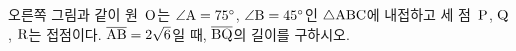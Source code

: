 \noindent\begin{minipage}[t]{0.58\linewidth}\vspace{0pt}\raggedright 오른쪽 그림과 같이 원~$\mathrm{O}$는 $\angle\mathrm{A}=75^\circ$, $\angle\mathrm{B}=45^\circ$인 $\triangle\mathrm{ABC}$에 내접하고 세 점~$\mathrm{P}$, $\mathrm{Q}$, $\mathrm{R}$는 접점이다. $\overline{\mathrm{AB}}=2\sqrt{6}$일 때, $\overline{\mathrm{BQ}}$의 길이를 구하시오.\end{minipage}\hfill\begin{minipage}[t]{0.4\linewidth}\vspace{0pt}\centering \resizebox{\ifdim\width>\linewidth\linewidth\else\width\fi}{!}{}\end{minipage}\par
